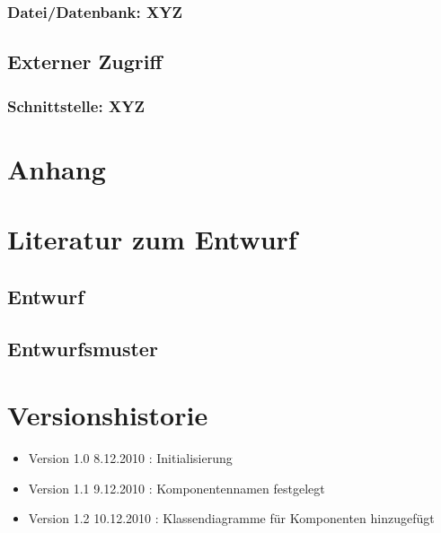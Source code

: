 \documentclass[a4paper,12pt]{scrartcl}
\begin{document}
\subsubsection{Datei/Datenbank: XYZ}
\subsection{Externer Zugriff}
\subsubsection{Schnittstelle: XYZ}

\appendix%

\section{Anhang}

\section{Literatur zum Entwurf}
\subsection{Entwurf}
\subsection{Entwurfsmuster}
\section{Versionshistorie}
\begin{itemize}
\item Version 1.0 8.12.2010 : Initialisierung
\item Version 1.1 9.12.2010 : Komponentennamen festgelegt
\item Version 1.2 10.12.2010 : Klassendiagramme für Komponenten hinzugefügt
\end{itemize}
\end{document}
